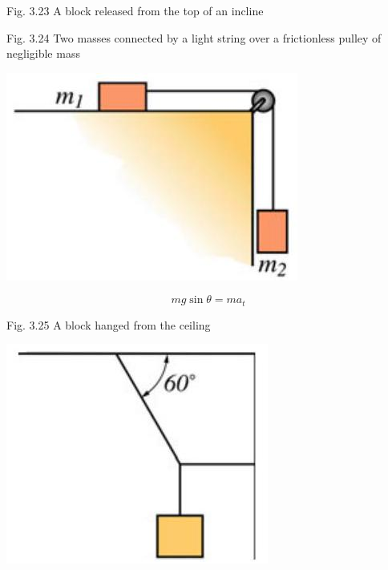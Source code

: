 \documentclass[10pt]{article}
\begin{document}
Fig. 3.23 A block released from the top of an incline

Fig. 3.24 Two masses connected by a light string over a frictionless pulley of negligible mass

\begin{center}
\includegraphics[max width=\textwidth]{2024_09_13_db1f357d2aad0a03eb2eg-059(1)}
\end{center}

$$
m g \sin \theta=m a_{t}
$$

Fig. 3.25 A block hanged from the ceiling

\begin{center}
\includegraphics[max width=\textwidth]{2024_09_13_db1f357d2aad0a03eb2eg-060(2)}
\end{center}
\end{document}
